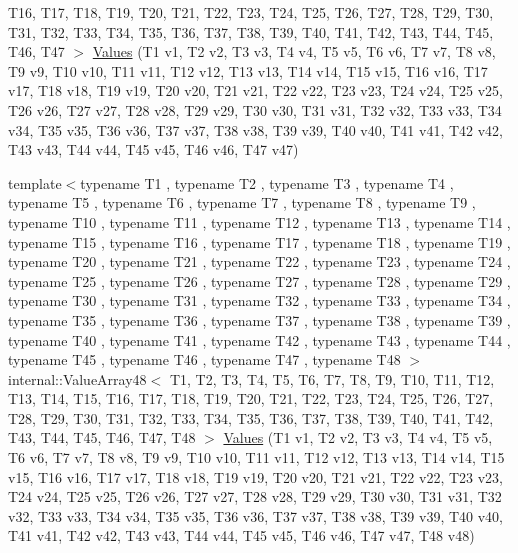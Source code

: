 \begin{DoxyCompactItemize}
\-T16, \-T17, \-T18, \-T19, \-T20, \-T21, \*
\-T22, \-T23, \-T24, \-T25, \-T26, \-T27, \*
\-T28, \-T29, \-T30, \-T31, \-T32, \-T33, \*
\-T34, \-T35, \-T36, \-T37, \-T38, \-T39, \*
\-T40, \-T41, \-T42, \-T43, \-T44, \-T45, \*
\-T46, \-T47 $>$ \hyperlink{namespacetesting_aba2697b2cd3e9d667ab3807022303240}{\-Values} (\-T1 v1, \-T2 v2, \-T3 v3, \-T4 v4, \-T5 v5, \-T6 v6, \-T7 v7, \-T8 v8, \-T9 v9, \-T10 v10, \-T11 v11, \-T12 v12, \-T13 v13, \-T14 v14, \-T15 v15, \-T16 v16, \-T17 v17, \-T18 v18, \-T19 v19, \-T20 v20, \-T21 v21, \-T22 v22, \-T23 v23, \-T24 v24, \-T25 v25, \-T26 v26, \-T27 v27, \-T28 v28, \-T29 v29, \-T30 v30, \-T31 v31, \-T32 v32, \-T33 v33, \-T34 v34, \-T35 v35, \-T36 v36, \-T37 v37, \-T38 v38, \-T39 v39, \-T40 v40, \-T41 v41, \-T42 v42, \-T43 v43, \-T44 v44, \-T45 v45, \-T46 v46, \-T47 v47)
\item 
{\footnotesize template$<$typename T1 , typename T2 , typename T3 , typename T4 , typename T5 , typename T6 , typename T7 , typename T8 , typename T9 , typename T10 , typename T11 , typename T12 , typename T13 , typename T14 , typename T15 , typename T16 , typename T17 , typename T18 , typename T19 , typename T20 , typename T21 , typename T22 , typename T23 , typename T24 , typename T25 , typename T26 , typename T27 , typename T28 , typename T29 , typename T30 , typename T31 , typename T32 , typename T33 , typename T34 , typename T35 , typename T36 , typename T37 , typename T38 , typename T39 , typename T40 , typename T41 , typename T42 , typename T43 , typename T44 , typename T45 , typename T46 , typename T47 , typename T48 $>$ }\\internal\-::\-Value\-Array48$<$ \-T1, \-T2, \*
\-T3, \-T4, \-T5, \-T6, \-T7, \-T8, \-T9, \*
\-T10, \-T11, \-T12, \-T13, \-T14, \-T15, \*
\-T16, \-T17, \-T18, \-T19, \-T20, \-T21, \*
\-T22, \-T23, \-T24, \-T25, \-T26, \-T27, \*
\-T28, \-T29, \-T30, \-T31, \-T32, \-T33, \*
\-T34, \-T35, \-T36, \-T37, \-T38, \-T39, \*
\-T40, \-T41, \-T42, \-T43, \-T44, \-T45, \*
\-T46, \-T47, \-T48 $>$ \hyperlink{namespacetesting_af3cdf373b137d357bb3a814c097bcd06}{\-Values} (\-T1 v1, \-T2 v2, \-T3 v3, \-T4 v4, \-T5 v5, \-T6 v6, \-T7 v7, \-T8 v8, \-T9 v9, \-T10 v10, \-T11 v11, \-T12 v12, \-T13 v13, \-T14 v14, \-T15 v15, \-T16 v16, \-T17 v17, \-T18 v18, \-T19 v19, \-T20 v20, \-T21 v21, \-T22 v22, \-T23 v23, \-T24 v24, \-T25 v25, \-T26 v26, \-T27 v27, \-T28 v28, \-T29 v29, \-T30 v30, \-T31 v31, \-T32 v32, \-T33 v33, \-T34 v34, \-T35 v35, \-T36 v36, \-T37 v37, \-T38 v38, \-T39 v39, \-T40 v40, \-T41 v41, \-T42 v42, \-T43 v43, \-T44 v44, \-T45 v45, \-T46 v46, \-T47 v47, \-T48 v48)

\end{DoxyCompactItemize}
